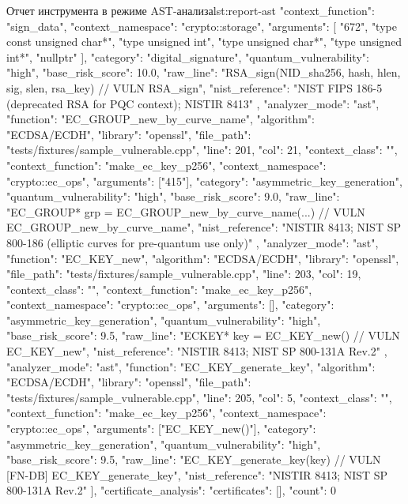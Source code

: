 \documentclass{itmo-vkr}
\begin{document}
\begin{itmolisting}[JSON]{Отчет инструмента в режиме AST-анализа}{lst:report-ast}
{{			"context_function": "sign_data",
			"context_namespace": "crypto::storage",
			"arguments": [
			"672",
			"type const unsigned char*",
			"type unsigned int",
			"type unsigned char*",
			"type unsigned int*",
			"nullptr"
			],
			"category": "digital_signature",
			"quantum_vulnerability": "high",
			"base_risk_score": 10.0,
			"raw_line": "RSA_sign(NID_sha256, hash, hlen, sig, slen, rsa_key) // VULN RSA_sign",
			"nist_reference": "NIST FIPS 186-5 (deprecated RSA for PQC context); NISTIR 8413"
		},
		{
			"analyzer_mode": "ast",
			"function": "EC_GROUP_new_by_curve_name",
			"algorithm": "ECDSA/ECDH",
			"library": "openssl",
			"file_path": "tests/fixtures/sample_vulnerable.cpp",
			"line": 201,
			"col": 21,
			"context_class": "",
			"context_function": "make_ec_key_p256",
			"context_namespace": "crypto::ec_ops",
			"arguments": ["415"],
			"category": "asymmetric_key_generation",
			"quantum_vulnerability": "high",
			"base_risk_score": 9.0,
			"raw_line": "EC_GROUP* grp = EC_GROUP_new_by_curve_name(...) // VULN EC_GROUP_new_by_curve_name",
			"nist_reference": "NISTIR 8413; NIST SP 800-186 (elliptic curves for pre-quantum use only)"
		},
		{
			"analyzer_mode": "ast",
			"function": "EC_KEY_new",
			"algorithm": "ECDSA/ECDH",
			"library": "openssl",
			"file_path": "tests/fixtures/sample_vulnerable.cpp",
			"line": 203,
			"col": 19,
			"context_class": "",
			"context_function": "make_ec_key_p256",
			"context_namespace": "crypto::ec_ops",
			"arguments": [],
			"category": "asymmetric_key_generation",
			"quantum_vulnerability": "high",
			"base_risk_score": 9.5,
			"raw_line": "ECKEY* key = EC_KEY_new() // VULN EC_KEY_new",
			"nist_reference": "NISTIR 8413; NIST SP 800-131A Rev.2"
		},
		{
			"analyzer_mode": "ast",
			"function": "EC_KEY_generate_key",
			"algorithm": "ECDSA/ECDH",
			"library": "openssl",
			"file_path": "tests/fixtures/sample_vulnerable.cpp",
			"line": 205,
			"col": 5,
			"context_class": "",
			"context_function": "make_ec_key_p256",
			"context_namespace": "crypto::ec_ops",
			"arguments": ["EC_KEY_new()"],
			"category": "asymmetric_key_generation",
			"quantum_vulnerability": "high",
			"base_risk_score": 9.5,
			"raw_line": "EC_KEY_generate_key(key) // VULN [FN-DB] EC_KEY_generate_key",
			"nist_reference": "NISTIR 8413; NIST SP 800-131A Rev.2"
		}
		],
		"certificate_analysis": {
			"certificates": [],
			"count": 0
		}
	}
\end{itmolisting}
\end{document}
